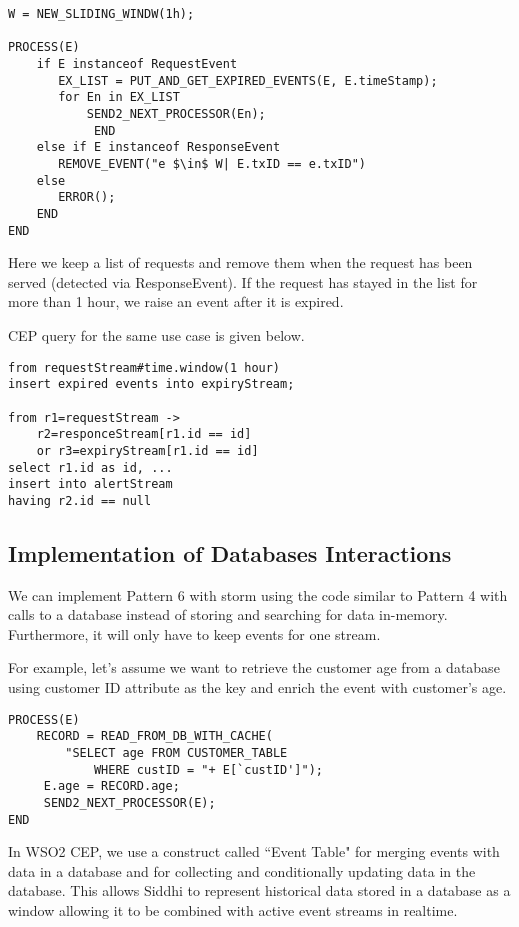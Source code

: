 \documentclass{sig-alternate}
\begin{document}
{\begin{lstlisting}[mathescape, showstringspaces=false]
W = NEW_SLIDING_WINDW(1h); 

PROCESS(E)  
    if E instanceof RequestEvent
       EX_LIST = PUT_AND_GET_EXPIRED_EVENTS(E, E.timeStamp);
       for En in EX_LIST
           SEND2_NEXT_PROCESSOR(En); 
			END        
    else if E instanceof ResponseEvent
       REMOVE_EVENT("e $\in$ W| E.txID == e.txID") 
    else 
       ERROR();
    END   
END 
\end{lstlisting}


Here we keep a list of requests and remove them when the request has been served (detected via ResponseEvent). If the request has stayed in the list for more than 1 hour, we raise an event after it is expired. 

CEP query for the same use case is given below. 

\begin{lstlisting}[mathescape, showstringspaces=false]
from requestStream#time.window(1 hour)
insert expired events into expiryStream;

from r1=requestStream -> 
	r2=responceStream[r1.id == id] 
	or r3=expiryStream[r1.id == id]
select r1.id as id, ...
insert into alertStream 
having r2.id == null
\end{lstlisting}



\subsection{Implementation of Databases Interactions}
We can implement Pattern 6 with storm using the code similar to Pattern 4 with calls to a database instead of storing and searching for data in-memory. Furthermore, it will only have to keep events for one stream. 

For example, let's assume we want to retrieve the customer age from a database using customer ID attribute as the key and enrich the event with customer's age. 


\begin{lstlisting}[mathescape, showstringspaces=false]
PROCESS(E) 
	RECORD = READ_FROM_DB_WITH_CACHE(
		"SELECT age FROM CUSTOMER_TABLE 
			WHERE custID = "+ E[`custID']");    
	 E.age = RECORD.age;
	 SEND2_NEXT_PROCESSOR(E); 
END   
\end{lstlisting}



In WSO2 CEP, we use a construct called ``Event Table" for merging events with data in a database and for collecting and conditionally updating data in the database. This allows Siddhi to represent historical data stored in a database as a window allowing it to be combined with active event streams in realtime. 

}
\end{document}
